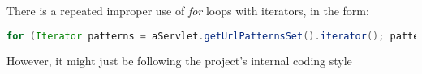 There is a repeated improper use of \textit{for} loops with iterators, in the form:

\begin{lstlisting}[language=Java, breaklines=true]
  for (Iterator patterns = aServlet.getUrlPatternsSet().iterator(); patterns.hasNext();)
\end{lstlisting}

However, it might just be following the project's internal coding style